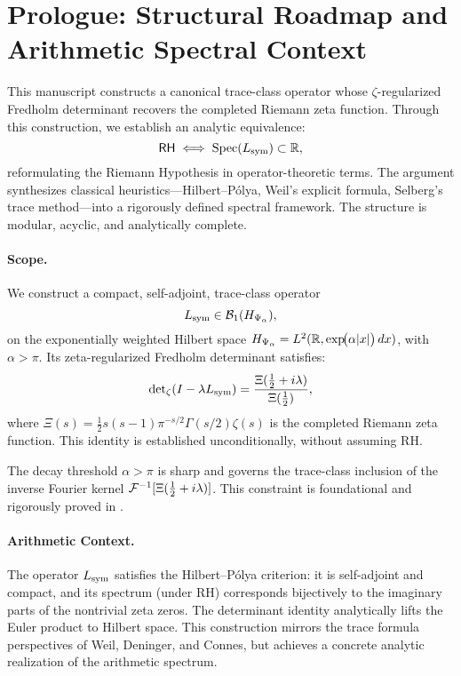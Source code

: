 \section*{Prologue: Structural Roadmap and Arithmetic Spectral Context}
\label{sec:prologue}

\medskip

\noindent
This manuscript constructs a canonical trace-class operator whose \(\zeta\)-regularized Fredholm determinant recovers the completed Riemann zeta function. Through this construction, we establish an analytic equivalence:
\[
\mathsf{RH} \iff \operatorname{Spec}(L_{\mathrm{sym}}) \subset \mathbb{R},
\]
reformulating the Riemann Hypothesis in operator-theoretic terms. The argument synthesizes classical heuristics—Hilbert–Pólya, Weil's explicit formula, Selberg’s trace method—into a rigorously defined spectral framework. The structure is modular, acyclic, and analytically complete.

\paragraph*{Scope.}
We construct a compact, self-adjoint, trace-class operator
\[
L_{\mathrm{sym}} \in \mathcal{B}_1(H_{\Psi_\alpha}),
\]
on the exponentially weighted Hilbert space \( H_{\Psi_\alpha} = L^2(\mathbb{R}, \exp\!\bigl(\alpha |x|\bigr)\,dx) \), with \( \alpha > \pi \). Its zeta-regularized Fredholm determinant satisfies:
\[
\det\nolimits_{\zeta}(I - \lambda L_{\mathrm{sym}}) = \frac{\Xi(\tfrac{1}{2} + i\lambda)}{\Xi(\tfrac{1}{2})},
\]
where \( \Xi(s) = \tfrac{1}{2}s(s-1)\pi^{-s/2} \Gamma(s/2) \zeta(s) \) is the completed Riemann zeta function. This identity is established unconditionally, without assuming RH.

The decay threshold \( \alpha > \pi \) is sharp and governs the trace-class inclusion of the inverse Fourier kernel \( \mathcal{F}^{-1}[\Xi(\tfrac{1}{2} + i\lambda)] \). This constraint is foundational and rigorously proved in .

\paragraph*{Arithmetic Context.}
The operator \( L_{\mathrm{sym}} \) satisfies the Hilbert–Pólya criterion: it is self-adjoint and compact, and its spectrum (under RH) corresponds bijectively to the imaginary parts of the nontrivial zeta zeros. The determinant identity analytically lifts the Euler product to Hilbert space. This construction mirrors the trace formula perspectives of Weil, Deninger, and Connes, but achieves a concrete analytic realization of the arithmetic spectrum.

